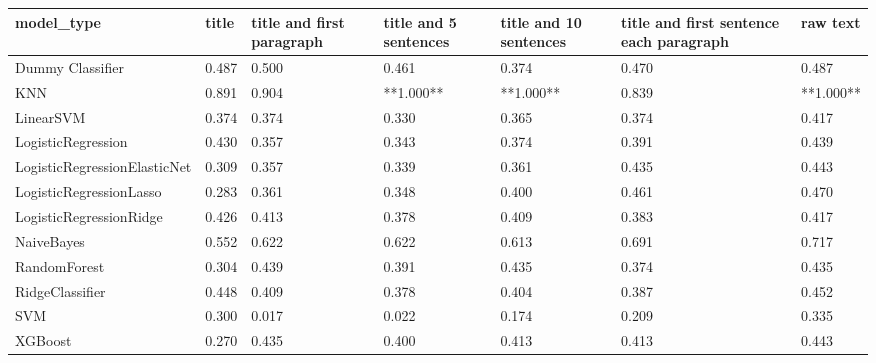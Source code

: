 \begin{tabular}{lllllll}
\toprule
                  model\_type & title & title and first paragraph & title and 5 sentences & title and 10 sentences & title and first sentence each paragraph &  raw text \\
\midrule
            Dummy Classifier & 0.487 &                     0.500 &                 0.461 &                  0.374 &                                   0.470 &     0.487 \\
                         KNN & 0.891 &                     0.904 &             **1.000** &              **1.000** &                                   0.839 & **1.000** \\
                   LinearSVM & 0.374 &                     0.374 &                 0.330 &                  0.365 &                                   0.374 &     0.417 \\
          LogisticRegression & 0.430 &                     0.357 &                 0.343 &                  0.374 &                                   0.391 &     0.439 \\
LogisticRegressionElasticNet & 0.309 &                     0.357 &                 0.339 &                  0.361 &                                   0.435 &     0.443 \\
     LogisticRegressionLasso & 0.283 &                     0.361 &                 0.348 &                  0.400 &                                   0.461 &     0.470 \\
     LogisticRegressionRidge & 0.426 &                     0.413 &                 0.378 &                  0.409 &                                   0.383 &     0.417 \\
                  NaiveBayes & 0.552 &                     0.622 &                 0.622 &                  0.613 &                                   0.691 &     0.717 \\
                RandomForest & 0.304 &                     0.439 &                 0.391 &                  0.435 &                                   0.374 &     0.435 \\
             RidgeClassifier & 0.448 &                     0.409 &                 0.378 &                  0.404 &                                   0.387 &     0.452 \\
                         SVM & 0.300 &                     0.017 &                 0.022 &                  0.174 &                                   0.209 &     0.335 \\
                     XGBoost & 0.270 &                     0.435 &                 0.400 &                  0.413 &                                   0.413 &     0.443 \\
\bottomrule
\end{tabular}
